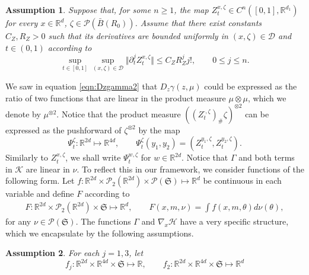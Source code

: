 \documentclass{article}
\newtheorem{assumption}{Assumption}
\newcommand{\R}{\mathbb{R}}
\begin{document}
\begin{appendices}
\begin{assumption}\label{assm:gevrey}
    Suppose that, for some $n \ge 1$, the map $Z^{x,\zeta}_t\in C^n([0,1],\R^{d_1})$
    for every $x\in\R^d$, $\zeta\in\mathcal P(\bar B(R_0))$. Assume that there exist constants $C_Z,R_Z>0$ such that its derivatives are bounded uniformly in $(x,\zeta)\in \mathscr D$ and $t\in(0,1)$ according to
\[
\sup_{t\in[0,1]}\sup_{(x,\zeta)\in \mathscr{D}}\Vert \partial_t^j Z^{x,\zeta}_{t}\Vert \le C_Z R_Z^j j!,\qquad 0\le j \le n.
\]
\end{assumption}
We saw in equation \eqref{eqn:Dzgamma2} that $D_z \gamma(z,\mu)$ could be expressed as the ratio of two functions that are linear in the product measure $\mu\otimes\mu$, which we denote by $\mu^{\otimes 2}$. Notice that the product measure $((Z^{\cdot,\zeta}_t)_\#\zeta)^{\otimes 2}$ can be expressed as the pushforward of $\zeta^{\otimes 2}$ by the map
\begin{equation}\label{eqn:prodmeasurefm}
        \Psi^{\zeta}_t: \R^{2d}\mapsto \R^{4d}, \qquad \Psi_t^{\zeta}(y_1,y_2)=\left(Z^{y_1,\zeta}_t,Z^{y_2,\zeta}_t \right).
\end{equation}
Similarly to $Z^{x,\zeta}_t$, we shall write $\Psi^{w,\zeta}_t$ for $w\in \R^{2d}$. Notice that $\Gamma$ and both terms in $\mathcal K$ are linear in $\nu$. To reflect this in our framework, we consider functions of the following form. Let $ f: \R^{2d}\times \mathcal P_2(\R^{2d})\times \mathcal P(\mathfrak{S})\mapsto \R^d$ be continuous in each variable and define $F$ according to
\begin{align}\label{eqn:F}
    F: \R^{2d}\times \mathcal P_2(\R^{2d})\times\mathfrak{S}\mapsto \R^d, \qquad F(x,m,\nu) = \int f(x,m,\theta)d\nu(\theta),
\end{align}
for any $\nu \in \mathcal P(\mathfrak{S})$. The functions $\Gamma$ and $\nabla_x\mathcal H$ have a very specific structure, which we encapsulate by the following assumptions.
\begin{assumption}\label{assm:StructuredF}
For each $j=1,3$, let
    $$f_j:\R^{2d}\times \R^{4d}\times \mathfrak{S}\mapsto \R, \qquad f_2:\R^{2d}\times \R^{4d}\times \mathfrak{S}\mapsto \R^d$$

\end{assumption}
\end{appendices}
\end{document}
